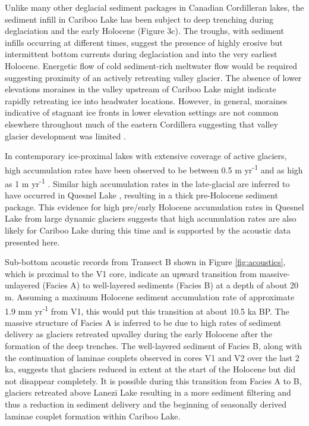 \documentclass[Royal,times,doublespace,sageh]{sagej}
\begin{document}
Unlike many other deglacial sediment packages in Canadian Cordilleran
lakes, the sediment infill in Cariboo Lake has been subject to deep
trenching during deglaciation and the early Holocene (Figure 3c). The
troughs, with sediment infills occurring at different times, suggest the
presence of highly erosive but intermittent bottom currents during
deglaciation and into the very earliest Holocene. Energetic flow of cold
sediment-rich meltwater flow would be required suggesting proximity of
an actively retreating valley glacier. The absence of lower elevations
moraines in the valley upstream of Cariboo Lake might indicate rapidly
retreating ice into headwater locations. However, in general, moraines
indicative of stagnant ice fronts in lower elevation settings are not
common elsewhere throughout much of the eastern Cordillera suggesting
that valley glacier development was limited \citep{Menounos2009b}.

In contemporary ice-proximal lakes with extensive coverage of active
glaciers, high accumulation rates have been observed to be between 0.5 m
yr\textsuperscript{-1} \citep{Crookshanks2008} and as high as 1 m
yr\textsuperscript{-1} \citep{Gilbert1997}. Similar high accumulation
rates in the late-glacial are inferred to have occurred in Quesnel Lake
\citep{Gilbert2012}, resulting in a thick pre-Holocene sediment package.
This evidence for high pre/early Holocene accumulation rates in Quesnel
Lake from large dynamic glaciers suggests that high accumulation rates
are also likely for Cariboo Lake during this time and is supported by
the acoustic data presented here.

Sub-bottom acoustic records from Transect B shown in Figure
\ref{fig:acoustics}, which is proximal to the V1 core, indicate an
upward transition from massive-unlayered (Facies A) to well-layered
sediments (Facies B) at a depth of about 20 m. Assuming a maximum
Holocene sediment accumulation rate of approximate 1.9 mm
yr\textsuperscript{-1} from V1, this would put this transition at about
10.5 ka BP. The massive structure of Facies A is inferred to be due to
high rates of sediment delivery as glaciers retreated upvalley during
the early Holocene after the formation of the deep trenches. The
well-layered sediment of Facies B, along with the continuation of
laminae couplets observed in cores V1 and V2 over the last 2 ka,
suggests that glaciers reduced in extent at the start of the Holocene
but did not disappear completely. It is possible during this transition
from Facies A to B, glaciers retreated above Lanezi Lake resulting in a
more sediment filtering and thus a reduction in sediment delivery and
the beginning of seasonally derived laminae couplet formation within
Cariboo Lake.
\end{document}
